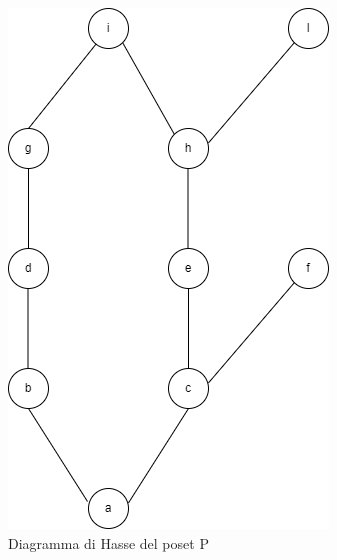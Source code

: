 \documentclass[a4paper,12pt, openright]{report}
\begin{document}
\begin{figure}[H]
    \centering
    \includegraphics[scale=.5]{hasse2.png}
    \caption{Diagramma di Hasse del poset P}
\end{figure} 
\end{document}
